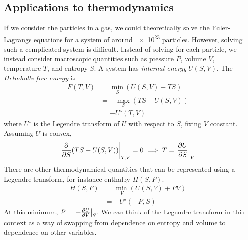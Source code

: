 \subsection{Applications to thermodynamics}
If we consider the particles in a gas, we could theoretically solve the Euler-Lagrange equations for a system of around \num{e23} particles.
However, solving such a complicated system is difficult.
Instead of solving for each particle, we instead consider macroscopic quantities such as pressure \( P \), volume \( V \), temperature \( T \), and entropy \( S \).
A system has \textit{internal energy} \( U(S, V) \).
The \textit{Helmholtz free energy} is
\begin{align*}
	F(T, V) & = \min_S (U(S, V) - TS)   \\
	        & = - \max_S (TS - U(S, V)) \\
	        & = -U^\star(T, V)
\end{align*}
where \( U^\star \) is the Legendre transform of \( U \) with respect to \( S \), fixing \( V \) constant.
Assuming \( U \) is convex,
\[
	\eval{\pdv{S} \qty(TS - U(S,V))}_{T,V} = 0 \implies T = \eval{\pdv{U}{S}}_{V}
\]
There are other thermodynamical quantities that can be represented using a Legendre transform, for instance enthalpy \( H(S, P) \).
\begin{align*}
	H(S, P) & = \min_V (U(S,V) + PV) \\
	        & = - U^\star(-P, S)
\end{align*}
At this minimum, \( P = \eval{-\pdv{U}{V}}_S \).
We can think of the Legendre transform in this context as a way of swapping from dependence on entropy and volume to dependence on other variables.

